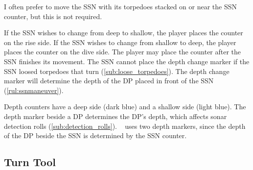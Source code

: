 \documentclass[../TacSubMicroRules.tex]{subfiles}
\begin{document}
\begin{design}
    I often prefer to move the SSN with its torpedoes stacked on or near the SSN counter, but this is not required.
\end{design}

 
If the SSN wishes to change from deep to shallow, the player places the counter on the rise side.
If the SSN wishes to change from shallow to deep, the player places the counter on the dive side.
The player may place the counter after the SSN finishes its movement.
The SSN cannot place the depth change marker if the SSN loosed torpedoes that turn (\ref{sub:loose_torpedoes}).
The depth change marker will determine the depth of the DP placed in front of the  SSN (\ref{rul:ssnmaneuver}).

 Depth counters have a deep side (dark blue) and a shallow side (light blue).
The depth marker beside a DP determines the DP's depth, which affects sonar detection rolls (\ref{sub:detection_rolls}).
\gametitle~ uses two depth markers, since the depth of the DP beside the SSN is determined by the SSN counter.

\subsection{Turn Tool}%
\label{sub:turn_tool}
\end{document}

